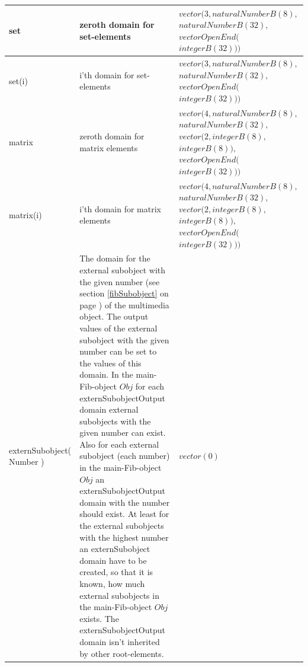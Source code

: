 \begin{center}
\begin{longtable}{|p{20mm}|p{55mm}|p{50mm}|}
	set & zeroth domain for set-elements & $vector( 3, naturalNumberB(8),$ $naturalNumberB(32),$ $vectorOpenEnd($ $integerB(32) ) )$ \\\hline
	set(i) & i'th domain for set-elements & $vector( 3, naturalNumberB(8),$ $naturalNumberB(32),$ $vectorOpenEnd($ $integerB(32) ) )$ \\\hline
	matrix & zeroth domain for matrix elements & $vector( 4, naturalNumberB(8),$ $naturalNumberB(32),$ $vector( 2, integerB(8),$ $integerB(8) ),$ $vectorOpenEnd($ $integerB(32) ) )$ \\\hline
	matrix(i) & i'th domain for matrix elements & $vector( 4, naturalNumberB(8),$ $naturalNumberB(32),$ $vector( 2, integerB(8),$ $integerB(8) ),$ $vectorOpenEnd($ $integerB(32) ) )$ \\\hline
	externSubobject( Number ) & The domain for the external subobject with the given number (see section \ref{fibSubobject} on page \pageref{fibSubobject}) of the multimedia object. The output values of the external subobject with the given number can be set to the values of this domain. In the main-Fib-object $Obj$  for each externSubobjectOutput domain external subobjects with the given number can exist. Also for each external subobject (each number) in the main-Fib-object $Obj$ an externSubobjectOutput domain with the number should exist. At least for the external subobjects with the highest number an externSubobject domain have to be created, so that it is known, how much external subobjects in the main-Fib-object $Obj$ exists. The externSubobjectOutput domain isn't inherited by other root-elements. & $vector( 0 )$ \\\hline



\end{longtable}
\end{center}
